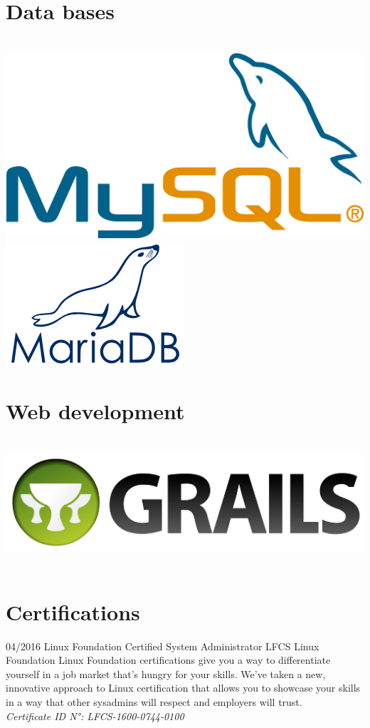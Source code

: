 \documentclass[]{friggeri-cv}
\begin{document}
\begin{aside}
    \section{Data bases}
    ~
    \includegraphics[scale=0.04]{img/mysql.png}
    \includegraphics[scale=0.30]{img/mariadb.png}
    ~
    \section{Web development}
    ~
    \includegraphics[scale=0.02]{img/grails.png}
    ~
\end{aside}
\section{Certifications}
\begin{entrylist}
    \entry
    {04/2016}
    {Linux Foundation Certified System Administrator LFCS}
    {Linux Foundation}
    {Linux Foundation certifications give you a way to differentiate yourself in
    a job market that's hungry for your skills. We've taken a new, innovative
    approach to Linux certification that allows you to showcase your skills in a
     way that other sysadmins will respect and employers will trust.\\
     \emph{Certificate ID N°{:} LFCS-1600-0744-0100}}
\end{entrylist}
\end{document}
